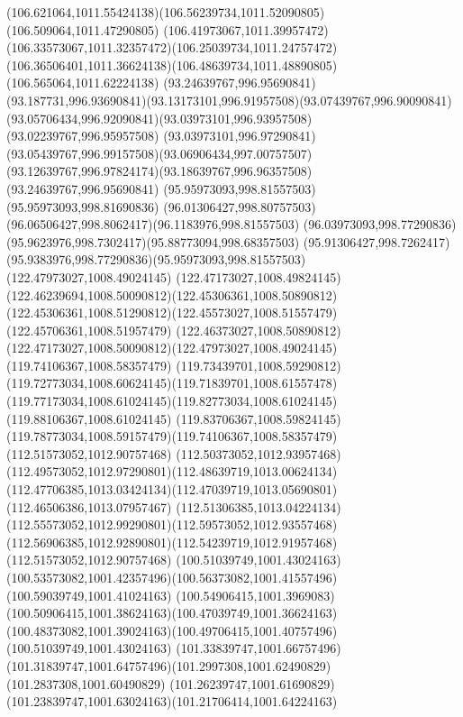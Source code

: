 {    \curveto(106.621064,1011.55424138)(106.56239734,1011.52090805)(106.509064,1011.47290805)
    \curveto(106.41973067,1011.39957472)(106.33573067,1011.32357472)(106.25039734,1011.24757472)
    \curveto(106.36506401,1011.36624138)(106.48639734,1011.48890805)(106.565064,1011.62224138)
    \moveto(93.24639767,996.95690841)
    \curveto(93.187731,996.93690841)(93.13173101,996.91957508)(93.07439767,996.90090841)
    \curveto(93.05706434,996.92090841)(93.03973101,996.93957508)(93.02239767,996.95957508)
    \curveto(93.03973101,996.97290841)(93.05439767,996.99157508)(93.06906434,997.00757507)
    \curveto(93.12639767,996.97824174)(93.18639767,996.96357508)(93.24639767,996.95690841)
    \moveto(95.95973093,998.81557503)
    \lineto(95.95973093,998.81690836)
    \curveto(96.01306427,998.80757503)(96.06506427,998.8062417)(96.1183976,998.81557503)
    \curveto(96.03973093,998.77290836)(95.9623976,998.7302417)(95.88773094,998.68357503)
    \curveto(95.91306427,998.7262417)(95.9383976,998.77290836)(95.95973093,998.81557503)
    \moveto(122.47973027,1008.49024145)
    \curveto(122.47173027,1008.49824145)(122.46239694,1008.50090812)(122.45306361,1008.50890812)
    \curveto(122.45306361,1008.51290812)(122.45573027,1008.51557479)(122.45706361,1008.51957479)
    \curveto(122.46373027,1008.50890812)(122.47173027,1008.50090812)(122.47973027,1008.49024145)
    \moveto(119.74106367,1008.58357479)
    \curveto(119.73439701,1008.59290812)(119.72773034,1008.60624145)(119.71839701,1008.61557478)
    \curveto(119.77173034,1008.61024145)(119.82773034,1008.61024145)(119.88106367,1008.61024145)
    \curveto(119.83706367,1008.59824145)(119.78773034,1008.59157479)(119.74106367,1008.58357479)
    \moveto(112.51573052,1012.90757468)
    \curveto(112.50373052,1012.93957468)(112.49573052,1012.97290801)(112.48639719,1013.00624134)
    \curveto(112.47706385,1013.03424134)(112.47039719,1013.05690801)(112.46506386,1013.07957467)
    \curveto(112.51306385,1013.04224134)(112.55573052,1012.99290801)(112.59573052,1012.93557468)
    \curveto(112.56906385,1012.92890801)(112.54239719,1012.91957468)(112.51573052,1012.90757468)
    \moveto(100.51039749,1001.43024163)
    \curveto(100.53573082,1001.42357496)(100.56373082,1001.41557496)(100.59039749,1001.41024163)
    \curveto(100.54906415,1001.3969083)(100.50906415,1001.38624163)(100.47039749,1001.36624163)
    \curveto(100.48373082,1001.39024163)(100.49706415,1001.40757496)(100.51039749,1001.43024163)
    \moveto(101.33839747,1001.66757496)
    \curveto(101.31839747,1001.64757496)(101.2997308,1001.62490829)(101.2837308,1001.60490829)
    \curveto(101.26239747,1001.61690829)(101.23839747,1001.63024163)(101.21706414,1001.64224163)
}
